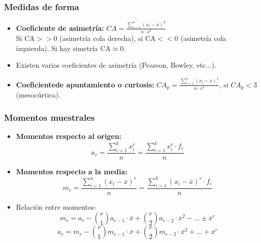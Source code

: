 \subsubsection{Medidas de forma}
\begin{itemize}
	\item \textbf{Coeficiente de asimetría:} $CA=\displaystyle \frac{\sum_{i=1}^{n}{(x_{i}-\overline{x})^3}}{n \cdot s^{3}}$\\ Si CA$>>$0 (asimetría cola derecha), si CA$<<$0 (asimetría cola izquierda). Si hay simetría CA$\simeq$0.
	\item Existen varios coeficientes de asimetría (Pearson, Bowley, etc$\hdots$).
	\item \textbf{Coeficientede apuntamiento o curtosis:} $CA_{p}=\displaystyle \frac{\sum_{i=1}^{n}{(x_{i}-\overline{x})^4}}{n \cdot s^{4}}$, si $CA_{p}<3$ (mesocúrtica).
\end{itemize}
\subsubsection{Momentos muestrales}
\begin{itemize}
	\item \textbf{Momentos respecto al origen:} $$a_{r}=\frac{\sum_{i=1}^{k}{x_{i}^{r}}}{n}=\frac{\sum_{i=1}^{k}{x_{i}^{r} \cdot f_{i}}}{n}$$
	\item \textbf{Momentos respecto a la media:} $$m_{r}=\frac{\sum_{i=1}^{n}{(x_{i}-\overline{x})^{r}}}{n}=\frac{\sum_{i=1}^{k}{(x_{i}-\overline{x})^{r}\cdot f_{i}}}{n}$$
	\item Relación entre momentos: $$m_{r}=a_{r}-\binom{r}{1}a_{r-1}\cdot \overline{x}+\binom{r}{2}a_{r-2}\cdot \overline{x}^{2}-\hdots \pm \overline{x}^{r}$$ $$a_{r}=m_{r}-\binom{r}{1}m_{r-1}\cdot \overline{x}+\binom{r}{2}m_{r-2}\cdot \overline{x}^{2}+\hdots + \overline{x}^{r}$$
\end{itemize}
